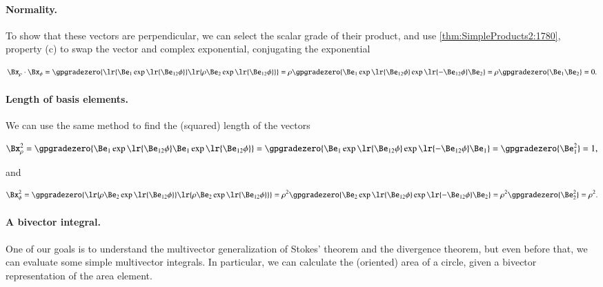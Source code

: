 \paragraph{Normality.}
To show that these vectors are
perpendicular, we can
select the scalar grade of their product, and
use \cref{thm:SimpleProducts2:1780}, property (c) to swap the vector and complex exponential, conjugating the exponential

\begin{dmath}\label{eqn:2Dcylindrical:640}
\Bx_\rho \cdot \Bx_\phi
=
\gpgradezero{
   \lr{ \Be_1 \exp\lr{ \Be_{12} \phi } }
   \lr{ \rho \Be_2 \exp\lr{ \Be_{12} \phi } }
}
=
\rho
\gpgradezero{
   \Be_1 \exp\lr{ \Be_{12} \phi }
   \exp\lr{ -\Be_{12} \phi } \Be_2
}
=
\rho
\gpgradezero{
   \Be_1
\Be_2
}
=
0.
\end{dmath}

\paragraph{Length of basis elements.}
We can use the same method to find the (squared) length of the vectors

\begin{dmath}\label{eqn:2Dcylindrical:680}
\Bx_\rho^2
=
\gpgradezero{
   \Be_1 \exp\lr{ \Be_{12} \phi }
   \Be_1 \exp\lr{ \Be_{12} \phi }
}
=
\gpgradezero{
   \Be_1 \exp\lr{ \Be_{12} \phi }
   \exp\lr{ -\Be_{12} \phi } \Be_1
}
=
\gpgradezero{
   \Be_1^2
}
= 1,
\end{dmath}

and

\begin{dmath}\label{eqn:2Dcylindrical:700}
\Bx_\phi^2
=
\gpgradezero{
   \lr{ \rho \Be_2 \exp\lr{ \Be_{12} \phi } }
   \lr{ \rho \Be_2 \exp\lr{ \Be_{12} \phi } }
}
=
\rho^2
\gpgradezero{
   \Be_2 \exp\lr{ \Be_{12} \phi }
   \exp\lr{ -\Be_{12} \phi } \Be_2
}
=
\rho^2
\gpgradezero{
\Be_2^2
}
= \rho^2.
\end{dmath}

\paragraph{A bivector integral.}
One of our goals is to understand the multivector generalization of Stokes' theorem and the divergence theorem, but even before that, we can evaluate some simple multivector integrals.  In particular, we can calculate the (oriented) area of a circle, given a bivector representation of the area element.

